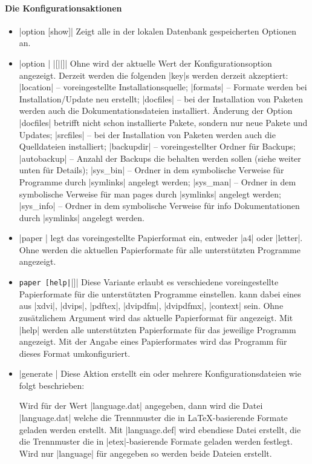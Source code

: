 \paragraph{Die Konfigurationsaktionen}
\begin{itemize}
\item |option [show]| Zeigt alle in der lokalen Datenbank gespeicherten
  Optionen an.
\item |option | |[||]| 
  Ohne  wird der aktuelle Wert der Konfigurationsoption 
  angezeigt. Derzeit werden die folgenden |key|s werden derzeit akzeptiert:
  |location| -- voreingestellte Installationsquelle; 
  |formats| -- Formate werden bei Installation/Update neu erstellt;
  |docfiles| -- bei der Installation von Paketen werden auch die
    Dokumentationsdateien installiert. Änderung der Option |docfiles| betrifft
    nicht schon installierte Pakete, sondern nur neue Pakete und 
    Updates;
  |srcfiles| -- bei der Installation von Paketen werden auch die
    Quelldateien installiert;
  |backupdir| -- voreingestellter Ordner für Backups;
  |autobackup| -- Anzahl der Backups die behalten werden sollen (siehe
    weiter unten für Details);
  |sys_bin| -- Ordner in dem symbolische Verweise für Programme 
    durch |symlinks| angelegt werden;
  |sys_man| -- Ordner in dem symbolische Verweise für man pages
    durch |symlinks| angelegt werden;
  |sys_info| -- Ordner in dem symbolische Verweise für info Dokumentationen
    durch |symlinks| angelegt werden.
\item |paper | legt das voreingestellte Papierformat ein, entweder
  |a4| oder |letter|. Ohne  werden die aktuellen Papierformate
  für alle unterstützten Programme angezeigt.
\item {} \Verb+paper [help|+|]|
  Diese Variante erlaubt es verschiedene voreingestellte Papierformate
  für die unterstützten Programme einstellen.  kann 
  dabei eines aus |xdvi|, |dvips|, |pdftex|, |dvipdfm|,
  |dvipdfmx|, |context| sein. 
  Ohne zusätzlichem Argument wird das aktuelle Papierformat für 
  angezeigt. Mit |help| werden alle unterstützten Papierformate für 
  das jeweilige Programm angezeigt. Mit der Angabe eines Papierformates
  wird das Programm für dieses Format umkonfiguriert.
\item |generate | Diese Aktion erstellt ein oder mehrere
  Konfigurationsdateien wie folgt beschrieben:
  
  Wird für  der Wert |language.dat| angegeben, dann wird 
  die Datei |language.dat| welche die Trennmuster die in \LaTeX-basierende
  Formate geladen werden erstellt.
  Mit |language.def| wird ebendiese Datei erstellt, die die Trennmuster
  die in |etex|-basierende Formate geladen werden festlegt.
  Wird nur |language| für  angegeben so werden beide Dateien
  erstellt.
  

\end{itemize}
